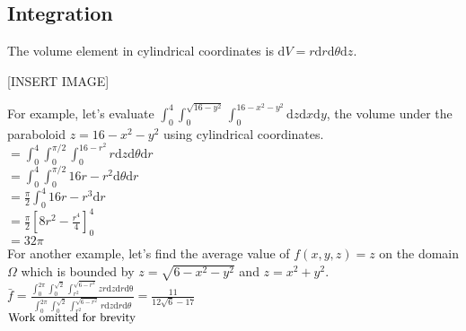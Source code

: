 \subsection{Integration}
\noindent
The volume element in cylindrical coordinates is $\mathrm{d}V=r\mathrm{d}r\mathrm{d}\theta\mathrm{d}z$.

[INSERT IMAGE]

\noindent
For example, let's evaluate $\int_{0}^{4}{\int_{0}^{\sqrt{16-y^2}}{\int_{0}^{16-x^2-y^2}{\mathrm{d}z}\mathrm{d}x}\mathrm{d}y}$, the volume under the paraboloid $z=16-x^2-y^2$ using cylindrical coordinates.\\
\indent
$=\int_{0}^{4}{\int_{0}^{\pi/2}{\int_{0}^{16-r^2}{r\mathrm{d}z}\mathrm{d}\theta}\mathrm{d}r}$\\
\indent
$=\int_{0}^{4}{\int_{0}^{\pi/2}{16r-r^2\mathrm{d}\theta}\mathrm{d}r}$\\
\indent
$=\frac{\pi}{2}\int_{0}^{4}{16r-r^3\mathrm{d}r}$\\
\indent
$=\frac{\pi}{2}\left[8r^2-\frac{r^4}{4}\right]_0^4$\\
\indent
$=32\pi$\\

\noindent
For another example, let's find the average value of $f(x,y,z)=z$ on the domain $\Omega$ which is bounded by $z=\sqrt{6-x^2-y^2}$ and $z=x^2+y^2$.\\
\indent
$\bar{f}=\frac{\int_{0}^{2\pi}{\int_{0}^{\sqrt{2}}{\int_{r^2}^{\sqrt{6-r^2}}{zr\mathrm{d}z}\mathrm{d}r}\mathrm{d\theta}}}{\int_{0}^{2\pi}{\int_{0}^{\sqrt{2}}{\int_{r^2}^{\sqrt{6-r^2}}{r\mathrm{d}z}\mathrm{d}r}\mathrm{d}\theta}}=\frac{11}{12\sqrt{6}-17}$\\
\indent
$\small{\text{Work omitted for brevity}}$\\